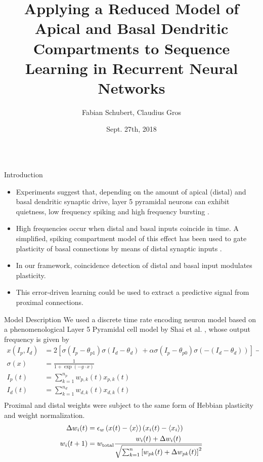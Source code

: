\documentclass{beamer}
\title{Applying a Reduced Model of Apical and Basal Dendritic Compartments to Sequence Learning in Recurrent Neural Networks}
\author{Fabian Schubert, Claudius Gros}
\institute{Institute for Theoretical Physics, Goethe University Frankfurt a.M.}
\date{Sept. 27th, 2018}
\begin{document}
\begin{frame}[t]
\begin{columns}[t]
\begin{column}{.4\textwidth}
\begin{myblock}{Introduction}
\begin{itemize}
\item Experiments suggest that, depending on the amount of apical (distal) and basal dendritic synaptic drive, layer 5 pyramidal neurons can exhibit quietness, low frequency spiking and high frequency bursting \cite{Letzkus_2006,Shai_2015}.
\item High frequencies occur when distal and basal inputs coincide in time. A simplified, spiking compartment model of this effect has been used to gate plasticity of basal connections by means of distal synaptic inputs \cite{Bono_2017}.
\item In our framework, coincidence detection of distal and basal input modulates plasticity.
\item This error-driven learning could be used to extract a predictive signal from proximal connections.
\end{itemize}
\end{myblock}

\begin{myblock}{Model Description}
We used a discrete time rate encoding neuron model based on a phenomenological Layer 5 Pyramidal cell model by Shai et al. \cite{Shai_2015}, whose output frequency is given by
\vspace{1\baselineskip}
\begin{align*}
x\left(I_p,I_d\right) &= 2 \left[ \sigma\left(I_p-\theta_{p1}\right) \sigma\left(I_d-\theta_d\right)\ +\alpha\sigma\left(I_p-\theta_{p0}\right)\sigma\left(-\left(I_d-\theta_d\right)\right)\right] - 1 \\
\sigma\left(x\right) &= \frac{1}{1+\exp(-g\cdot x)} \\
I_p (t) &= \sum_{k=1}^{n_p} w_{p,k} (t) x_{p,k} (t) \\
I_d (t) &= \sum_{k=1}^{n_d} w_{d,k} (t) x_{d,k} (t) \\
\end{align*}
Proximal and distal weights were subject to the same form of Hebbian plasticity and weight normalization.
\vspace{1\baselineskip}
\begin{align*}
\Delta w_{i} (t) &= \epsilon_w \left(x(t)-\langle x \rangle\right)\left(x_{i}(t)-\langle x_{i} \rangle \right) \\
w_{i}(t+1) &= w_{\rm total} \frac{w_{i}(t) + \Delta w_{i}(t)}{\sqrt{\sum_{k=1}^{n} \left[ w_{pk}(t) + \Delta w_{pk}(t) \right]^2}}
\end{align*}
\end{myblock}


\end{column}
\end{columns}
\end{frame}
\end{document}
